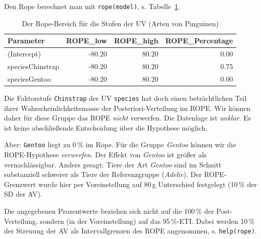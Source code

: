 \documentclass[
  ngerman,
  letterpaper,
  twoside,
  open=any]{scrbook}
\theoremstyle{definition}
\theoremstyle{plain}
\theoremstyle{definition}
\theoremstyle{definition}
\theoremstyle{definition}
\theoremstyle{definition}
\theoremstyle{remark}
\begin{document}
Den Rope berechnet man mit \texttt{rope(model)}, s.
Tabelle~\ref{tbl-peng-species-rope}.

{

\begin{longtable}[]{@{}lrrr@{}}

\caption{\label{tbl-peng-species-rope}Der Rope-Bereich für die Stufen
der UV (Arten von Pinguinen)}

\tabularnewline

\toprule\noalign{}
Parameter & ROPE\_low & ROPE\_high & ROPE\_Percentage \\
\midrule\noalign{}
\endhead
\bottomrule\noalign{}
\endlastfoot
(Intercept) & -80.20 & 80.20 & 0.00 \\
speciesChinstrap & -80.20 & 80.20 & 0.75 \\
speciesGentoo & -80.20 & 80.20 & 0.00 \\

\end{longtable}

}

Die Faktorstufe \texttt{Chinstrap} der UV \texttt{species} hat doch
einen beträchtlichen Teil ihrer Wahrscheinlichkeitsmasse der
Posteriori-Verteilung im ROPE. Wir können daher für diese Gruppe das
ROPE \emph{nicht} verwerfen. Die Datenlage ist \emph{unklar}. Es ist
keine abschließende Entscheidung über die Hypothese möglich.

Aber: \texttt{Gentoo} liegt zu 0\,\% im Rope. Für die Gruppe
\emph{Gentoo} können wir die ROPE-Hypothese \emph{verwerfen}. Der Effekt
von \emph{Gentoo} ist größer als vernachlässigbar. Anders gesagt: Tiere
der Art \emph{Gentoo} sind im Schnitt substanziell schwerer als Tiere
der Referenzgruppe (\emph{Adelie}). Der ROPE-Grenzwert wurde hier per
Voreinstellung auf 80\,g Unterschied festgelegt (10\,\% der SD der AV).

\begin{tcolorbox}[enhanced jigsaw, arc=.35mm, bottomrule=.15mm, bottomtitle=1mm, breakable, colback=white, colbacktitle=quarto-callout-note-color!10!white, colframe=quarto-callout-note-color-frame, coltitle=black, left=2mm, leftrule=.75mm, opacityback=0, opacitybacktitle=0.6, rightrule=.15mm, title=\textcolor{quarto-callout-note-color}{\faInfo}\hspace{0.5em}{Hinweis}, titlerule=0mm, toprule=.15mm, toptitle=1mm]

Die angegebenen Prozentwerte beziehen sich nicht auf die 100\,\% der
Post-Verteilung, sondern (in der Voreinstellung) auf das 95\,\%-ETI.
Dabei werden 10\,\% der Streuung der AV als Intervallgrenzen des ROPE
angenommen, s. \texttt{help(rope)}.

\end{tcolorbox}
\end{document}
